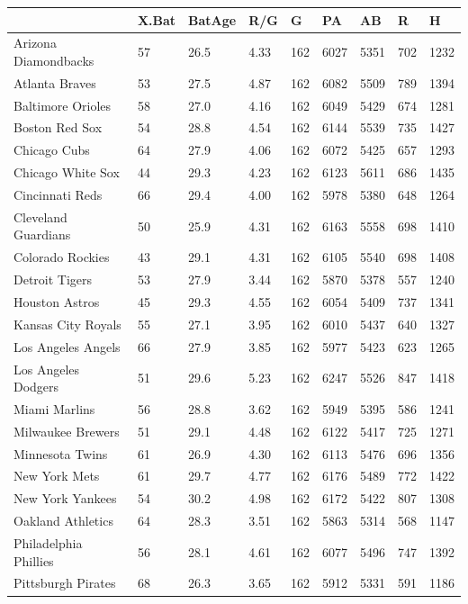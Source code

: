 \documentclass[
  11pt,
]{book}
\theoremstyle{definition}
\theoremstyle{definition}
\theoremstyle{definition}
\theoremstyle{definition}
\theoremstyle{remark}
\begin{document}
\begin{tabular}{lllllllll}
\toprule
  & X.Bat & BatAge & R/G & G & PA & AB & R & H\\
\midrule
Arizona Diamondbacks & 57 & 26.5 & 4.33 & 162 & 6027 & 5351 & 702 & 1232\\
Atlanta Braves & 53 & 27.5 & 4.87 & 162 & 6082 & 5509 & 789 & 1394\\
Baltimore Orioles & 58 & 27.0 & 4.16 & 162 & 6049 & 5429 & 674 & 1281\\
Boston Red Sox & 54 & 28.8 & 4.54 & 162 & 6144 & 5539 & 735 & 1427\\
Chicago Cubs & 64 & 27.9 & 4.06 & 162 & 6072 & 5425 & 657 & 1293\\
\addlinespace
Chicago White Sox & 44 & 29.3 & 4.23 & 162 & 6123 & 5611 & 686 & 1435\\
Cincinnati Reds & 66 & 29.4 & 4.00 & 162 & 5978 & 5380 & 648 & 1264\\
Cleveland Guardians & 50 & 25.9 & 4.31 & 162 & 6163 & 5558 & 698 & 1410\\
Colorado Rockies & 43 & 29.1 & 4.31 & 162 & 6105 & 5540 & 698 & 1408\\
Detroit Tigers & 53 & 27.9 & 3.44 & 162 & 5870 & 5378 & 557 & 1240\\
\addlinespace
Houston Astros & 45 & 29.3 & 4.55 & 162 & 6054 & 5409 & 737 & 1341\\
Kansas City Royals & 55 & 27.1 & 3.95 & 162 & 6010 & 5437 & 640 & 1327\\
Los Angeles Angels & 66 & 27.9 & 3.85 & 162 & 5977 & 5423 & 623 & 1265\\
Los Angeles Dodgers & 51 & 29.6 & 5.23 & 162 & 6247 & 5526 & 847 & 1418\\
Miami Marlins & 56 & 28.8 & 3.62 & 162 & 5949 & 5395 & 586 & 1241\\
\addlinespace
Milwaukee Brewers & 51 & 29.1 & 4.48 & 162 & 6122 & 5417 & 725 & 1271\\
Minnesota Twins & 61 & 26.9 & 4.30 & 162 & 6113 & 5476 & 696 & 1356\\
New York Mets & 61 & 29.7 & 4.77 & 162 & 6176 & 5489 & 772 & 1422\\
New York Yankees & 54 & 30.2 & 4.98 & 162 & 6172 & 5422 & 807 & 1308\\
Oakland Athletics & 64 & 28.3 & 3.51 & 162 & 5863 & 5314 & 568 & 1147\\
\addlinespace
Philadelphia Phillies & 56 & 28.1 & 4.61 & 162 & 6077 & 5496 & 747 & 1392\\
Pittsburgh Pirates & 68 & 26.3 & 3.65 & 162 & 5912 & 5331 & 591 & 1186\\

\end{tabular}
\end{document}
